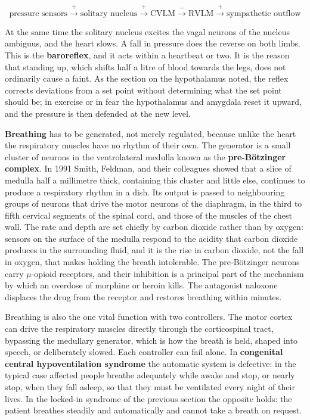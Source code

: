 \documentclass[11pt]{article}
\begin{document}
\[
\text{pressure sensors} \xrightarrow{\;+\;} \text{solitary nucleus} \xrightarrow{\;+\;} \text{CVLM} \xrightarrow{\;-\;} \text{RVLM} \xrightarrow{\;+\;} \text{sympathetic outflow}
\]

At the same time the solitary nucleus excites the vagal neurons of the nucleus ambiguus, and the heart slows. A fall in pressure does the reverse on both limbs. This is the \textbf{baroreflex}, and it acts within a heartbeat or two. It is the reason that standing up, which shifts half a litre of blood towards the legs, does not ordinarily cause a faint. As the section on the hypothalamus noted, the reflex corrects deviations from a set point without determining what the set point should be; in exercise or in fear the hypothalamus and amygdala reset it upward, and the pressure is then defended at the new level.

\textbf{Breathing} has to be generated, not merely regulated, because unlike the heart the respiratory muscles have no rhythm of their own. The generator is a small cluster of neurons in the ventrolateral medulla known as the \textbf{pre-B\"otzinger complex}. In 1991 Smith, Feldman, and their colleagues showed that a slice of medulla half a millimetre thick, containing this cluster and little else, continues to produce a respiratory rhythm in a dish. Its output is passed to neighbouring groups of neurons that drive the motor neurons of the diaphragm, in the third to fifth cervical segments of the spinal cord, and those of the muscles of the chest wall. The rate and depth are set chiefly by carbon dioxide rather than by oxygen: sensors on the surface of the medulla respond to the acidity that carbon dioxide produces in the surrounding fluid, and it is the rise in carbon dioxide, not the fall in oxygen, that makes holding the breath intolerable. The pre-B\"otzinger neurons carry $\mu$-opioid receptors, and their inhibition is a principal part of the mechanism by which an overdose of morphine or heroin kills. The antagonist naloxone displaces the drug from the receptor and restores breathing within minutes.

Breathing is also the one vital function with two controllers. The motor cortex can drive the respiratory muscles directly through the corticospinal tract, bypassing the medullary generator, which is how the breath is held, shaped into speech, or deliberately slowed. Each controller can fail alone. In \textbf{congenital central hypoventilation syndrome} the automatic system is defective: in the typical case affected people breathe adequately while awake and stop, or nearly stop, when they fall asleep, so that they must be ventilated every night of their lives. In the locked-in syndrome of the previous section the opposite holds: the patient breathes steadily and automatically and cannot take a breath on request.
\end{document}
